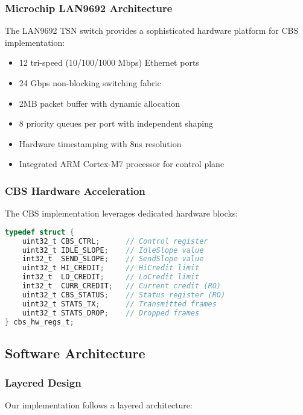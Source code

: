 \documentclass[10pt, journal, compsoc]{IEEEtran}
\begin{document}
\subsubsection{Microchip LAN9692 Architecture}

The LAN9692 TSN switch provides a sophisticated hardware platform for CBS implementation:

\begin{itemize}
    \item 12 tri-speed (10/100/1000 Mbps) Ethernet ports
    \item 24 Gbps non-blocking switching fabric
    \item 2MB packet buffer with dynamic allocation
    \item 8 priority queues per port with independent shaping
    \item Hardware timestamping with 8ns resolution
    \item Integrated ARM Cortex-M7 processor for control plane
\end{itemize}

\subsubsection{CBS Hardware Acceleration}

The CBS implementation leverages dedicated hardware blocks:

\begin{lstlisting}[language=C, caption=CBS Hardware Register Structure]
typedef struct {
    uint32_t CBS_CTRL;      // Control register
    uint32_t IDLE_SLOPE;    // IdleSlope value
    int32_t  SEND_SLOPE;    // SendSlope value
    uint32_t HI_CREDIT;     // HiCredit limit
    int32_t  LO_CREDIT;     // LoCredit limit
    int32_t  CURR_CREDIT;   // Current credit (RO)
    uint32_t CBS_STATUS;    // Status register (RO)
    uint32_t STATS_TX;      // Transmitted frames
    uint32_t STATS_DROP;    // Dropped frames
} cbs_hw_regs_t;
\end{lstlisting}

\subsection{Software Architecture}

\subsubsection{Layered Design}

Our implementation follows a layered architecture:
\end{document}
